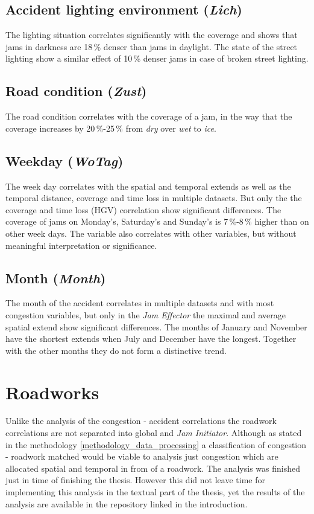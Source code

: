 \subsection{Accident lighting environment (\textit{Lich})}
\label{analysis_sum_Lich}
The lighting situation correlates significantly with the coverage and shows that jams in darkness are 18\,\% denser than jams in daylight. The state of the street lighting show a similar effect of 10\,\% denser jams in case of broken street lighting.

\subsection{Road condition (\textit{Zust})}
\label{analysis_sum_Zust}
The road condition correlates with the coverage of a jam, in the way that the coverage increases by 20\,\%-25\,\% from \textit{dry} over \textit{wet} to \textit{ice}.

\subsection{Weekday (\textit{WoTag})}
\label{analysis_sum_WoTag}
The week day correlates with the spatial and temporal extends as well as the temporal distance, coverage and time loss in multiple datasets. But only the the coverage and time loss (HGV) correlation show significant differences. The coverage of jams on Monday's, Saturday's and Sunday's is 7\,\%-8\,\% higher than on other week days. The variable also correlates with other variables, but without meaningful interpretation or significance.

\subsection{Month (\textit{Month})}
\label{analysis_sum_Month}
The month of the accident correlates in multiple datasets and with most congestion variables, but only in the \textit{Jam Effector} the maximal and average spatial extend show significant differences. The months of January and November have the shortest extends when July and December have the longest. Together with the other months they do not form a distinctive trend. 

\section{Roadworks}
Unlike the analysis of the congestion - accident correlations the roadwork correlations are not separated into global and \textit{Jam Initiator}. Although as stated in the methodology \cref{methodology_data_processing} a classification of congestion - roadwork matched would be viable to analysis just congestion which are allocated spatial and temporal in from of a roadwork. The analysis was finished just in time of finishing the thesis. However this did not leave time for implementing this analysis in the textual part of the thesis, yet the results of the analysis are available in the repository linked in the introduction.

